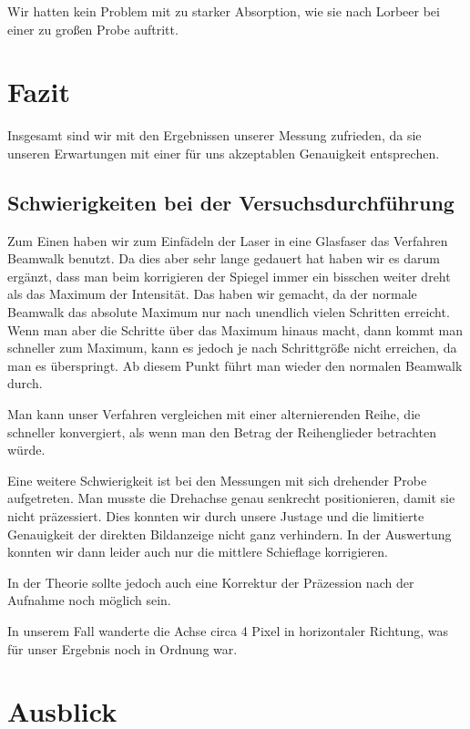 Wir hatten kein Problem mit zu starker Absorption, wie sie nach Lorbeer \cite{slot_paper} bei einer zu großen Probe auftritt.

%

\section{Fazit}
Insgesamt sind wir mit den Ergebnissen unserer Messung zufrieden, da sie unseren Erwartungen mit einer für uns akzeptablen Genauigkeit entsprechen.

\subsection{Schwierigkeiten bei der Versuchsdurchführung}
Zum Einen haben wir zum Einfädeln der Laser in eine Glasfaser das Verfahren Beamwalk benutzt. Da dies aber sehr lange gedauert hat haben wir es darum ergänzt, dass man beim korrigieren der Spiegel immer ein bisschen weiter dreht als das Maximum der Intensität.
Das haben wir gemacht, da der normale Beamwalk das absolute Maximum nur nach unendlich vielen Schritten erreicht.
Wenn man aber die Schritte über das Maximum hinaus macht, dann kommt man schneller zum Maximum, kann es jedoch je nach Schrittgröße nicht erreichen, da man es überspringt.
Ab diesem Punkt führt man wieder den normalen Beamwalk durch.

Man kann unser Verfahren vergleichen mit einer alternierenden Reihe, die schneller konvergiert, als wenn man den Betrag der Reihenglieder betrachten würde.

Eine weitere Schwierigkeit ist bei den Messungen mit sich drehender Probe aufgetreten.
Man musste die Drehachse genau senkrecht positionieren, damit sie nicht präzessiert.
Dies konnten wir durch unsere Justage und die limitierte Genauigkeit der direkten Bildanzeige nicht ganz verhindern.
In der Auswertung konnten wir dann leider auch nur die mittlere Schieflage korrigieren.

In der Theorie sollte jedoch auch eine Korrektur der Präzession nach der Aufnahme noch möglich sein.

In unserem Fall wanderte die Achse circa 4 Pixel in horizontaler Richtung, was für unser Ergebnis noch in Ordnung war.

\section{Ausblick}
